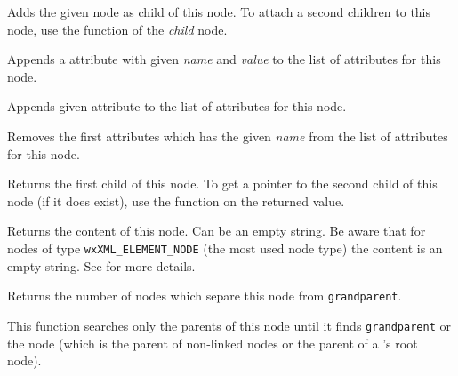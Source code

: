 \label{wxxmlnodeaddchild}


Adds the given node as child of this node. To attach a second children to this node, use the
 function of the {\it child} node.

\label{wxxmlnodeaddattribute}


Appends a attribute with given {\it name} and {\it value} to the list of attributes for this node.


Appends given attribute to the list of attributes for this node.

\label{wxxmlnodedeleteattribute}


Removes the first attributes which has the given {\it name} from the list of attributes for this node.

\label{wxxmlnodegetchildren}


Returns the first child of this node.
To get a pointer to the second child of this node (if it does exist), use the
 function on the returned value.

\label{wxxmlnodegetcontent}


Returns the content of this node. Can be an empty string.
Be aware that for nodes of type \texttt{wxXML\_ELEMENT\_NODE} (the most used node type) the
content is an empty string. See  for more details.


\label{wxxmlnodegetdepth}


Returns the number of nodes which separe this node from {\tt grandparent}.

This function searches only the parents of this node until it finds {\tt grandparent}
or the \NULL node (which is the parent of non-linked nodes or the parent of a
's root node).


